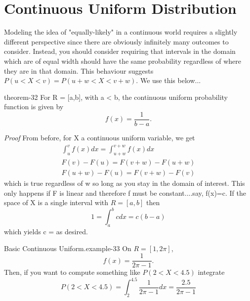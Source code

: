 \documentclass[10pt,]{book}
\makeatletter
\renewcommand*{\proofname}{Proof}
\renewenvironment{proof}[1][\proofname]{\par
  \pushQED{\qed}%
  \normalfont \topsep6\p@\@plus6\p@\relax
  \trivlist
  \item\relax
    {\itshape
    #1\@addpunct{.}}\hspace\labelsep\ignorespaces
}{%
  \popQED\endtrivlist\@endpefalse
}
\numberwithin{equation}{section}
\newcommand{\lt}{<}
\makeatother
\begin{document}
\section[{Continuous Uniform Distribution}]{Continuous Uniform Distribution}\label{section-41}
\hypertarget{p-785}{}%
Modeling the idea of "equally-likely" in a continuous world requires a slightly different perspective since there are obviously infinitely many outcomes to consider. Instead, you should consider requiring that intervals in the domain which are of equal width should have the same probability regardless of where they are in that domain. This behaviour suggests \(P(u \lt X \lt v) = P(u + w \lt X \lt v + w)\).  We use this below...%
\par
\hypertarget{p-786}{}%
\begin{theorem}{}{}{theorem-32}%
\hypertarget{ContinuousUniformFunction}{}%
For R = [a,b], with a < b, the continuous uniform probability function is given by%
\begin{equation*}
f(x) = \frac{1}{b-a}.
\end{equation*}
%
\end{theorem}
\begin{proof}\hypertarget{proof-35}{}
\hypertarget{p-788}{}%
From before, for X a continuous uniform variable, we get%
\begin{gather*}
\int_u^v f(x) dx = \int_{u+w}^{v+w} f(x) dx\\
F(v)-F(u) = F(v+w)-F(u+w)\\
F(u+w)-F(u) = F(v+w)-F(v)
\end{gather*}
which is true regardless of w so long as you stay in the domain of interest. This only happens if F is linear and therefore f must be constant....say, f(x)=c. If the space of X is a single interval with \(R = [a,b]\) then%
\begin{equation*}
1 = \int_a^b c dx = c(b-a)
\end{equation*}
which yields c =  as desired.%
\end{proof}
%
\par
\hypertarget{p-789}{}%
\begin{example}{Basic Continuous Uniform.}{example-33}%
\hypertarget{p-790}{}%
On \(R = [1,2 \pi]\),%
\begin{equation*}
f(x) = \frac{1}{2 \pi - 1}.
\end{equation*}
Then, if you want to compute something like \(P(2 < X < 4.5)\) integrate%
\begin{equation*}
P(2 < X < 4.5) = \int_2^{4.5} \frac{1}{2 \pi -1} dx = \frac{2.5}{2 \pi - 1}
\end{equation*}
%
\end{example}
\end{document}
